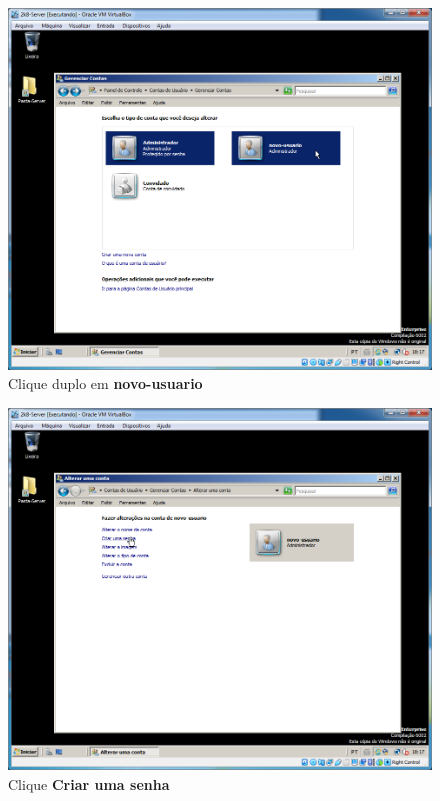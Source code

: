 \documentclass[10pt]{article}
\begin{document}
\begin{figure}[H]
    \centering
    \caption{Clique duplo em \textbf{novo-usuario}}
    \label{fig:ar006}
    \includegraphics[width=\linewidth]{images/acesso_remoto/ar006.png}
\end{figure}
\begin{figure}[H]
    \centering
    \caption{Clique \textbf{Criar uma senha}}
    \label{fig:ar007}
    \includegraphics[width=\linewidth]{images/acesso_remoto/ar007.png}
\end{figure}
\end{document}
